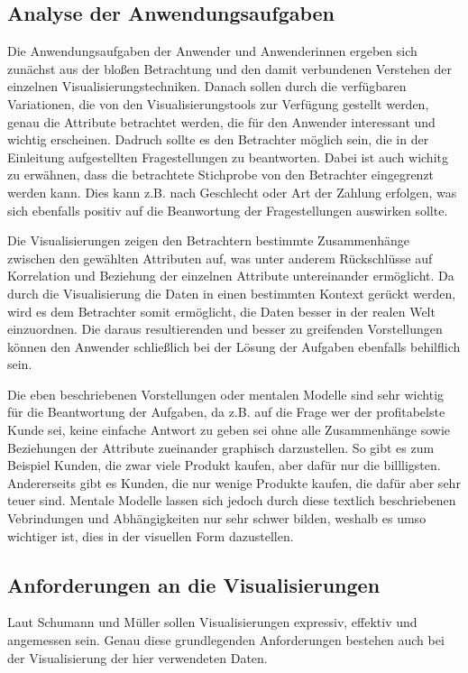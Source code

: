 \documentclass[usegeometry=true]{scrartcl}
\begin{document}
\subsection{Analyse der Anwendungsaufgaben}
Die Anwendungsaufgaben der Anwender und Anwenderinnen ergeben sich zunächst aus der bloßen Betrachtung und den damit verbundenen Verstehen der einzelnen Visualisierungstechniken.
Danach sollen durch die verfügbaren Variationen, die von den Visualisierungstools zur Verfügung gestellt werden, genau die Attribute betrachtet werden, die für den Anwender
interessant und wichtig erscheinen. Dadruch sollte es den Betrachter möglich sein, die in der Einleitung aufgestellten Fragestellungen zu beantworten. Dabei ist auch wichitg zu
erwähnen, dass die betrachtete Stichprobe von den Betrachter eingegrenzt werden kann. Dies kann z.B. nach Geschlecht oder Art der Zahlung erfolgen, was sich ebenfalls positiv
auf die Beanwortung der Fragestellungen auswirken sollte.

\noindent Die Visualisierungen zeigen den Betrachtern bestimmte Zusammenhänge zwischen den gewählten Attributen auf, was unter anderem Rückschlüsse auf Korrelation
und Beziehung der einzelnen Attribute untereinander ermöglicht. Da durch die Visualisierung die Daten in einen bestimmten Kontext gerückt werden, wird es dem Betrachter somit
ermöglicht, die Daten besser in der realen Welt einzuordnen. Die daraus resultierenden und besser zu greifenden Vorstellungen können den Anwender schließlich bei der Lösung der
Aufgaben ebenfalls behilflich sein.

\noindent Die eben beschriebenen Vorstellungen oder mentalen Modelle sind sehr wichtig für die Beantwortung der Aufgaben, da z.B. auf die Frage wer der profitabelste Kunde sei,
keine einfache Antwort zu geben sei ohne alle Zusammenhänge sowie Beziehungen der Attribute zueinander graphisch darzustellen. So gibt es zum Beispiel Kunden, die zwar viele
Produkt kaufen, aber dafür nur die billligsten. Andererseits gibt es Kunden, die nur wenige Produkte kaufen, die dafür aber sehr teuer sind. Mentale Modelle lassen sich jedoch
durch diese textlich beschriebenen Vebrindungen und Abhängigkeiten nur sehr schwer bilden, weshalb es umso wichtiger ist, dies in der visuellen Form dazustellen.

\subsection{Anforderungen an die Visualisierungen}\label{Anforderung}
Laut Schumann und Müller sollen Visualisierungen expressiv, effektiv und angemessen sein. \cite[9]{schumann2013visualisierung} Genau diese grundlegenden Anforderungen bestehen
auch bei der Visualisierung der hier verwendeten Daten.
\end{document}
